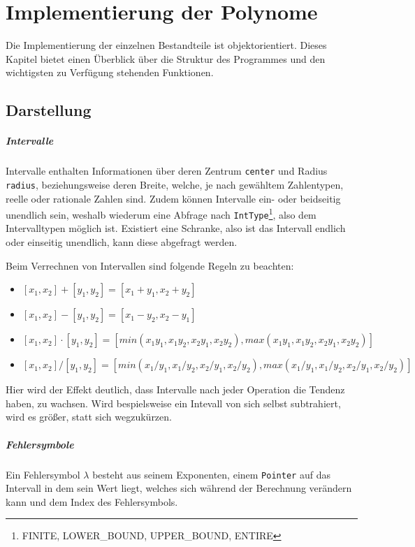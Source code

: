 \chapter{Implementierung der Polynome}

Die Implementierung der einzelnen Bestandteile ist objektorientiert. Dieses Kapitel bietet einen Überblick über die Struktur des Programmes und den wichtigsten zu Verfügung stehenden Funktionen.

\section{Darstellung}

\paragraph{Intervalle}
Intervalle enthalten Informationen über deren Zentrum \verb+center+ und Radius \verb+radius+, beziehungsweise deren Breite, welche, je nach gewähltem Zahlentypen, reelle oder rationale Zahlen sind. Zudem können Intervalle ein- oder beidseitig unendlich sein, weshalb wiederum eine Abfrage nach \verb+IntType+\footnote{ FINITE, LOWER\_BOUND, UPPER\_BOUND, ENTIRE }, also dem Intervalltypen möglich ist. Existiert eine Schranke, also ist das Intervall endlich oder einseitig unendlich, kann diese abgefragt werden. \par
Beim Verrechnen von Intervallen sind folgende Regeln zu beachten:
\begin{itemize}
    \item[] $[x_1, x_2] + [y_1, y_2] = [x_1 + y_1, x_2 + y_2]$
    \item[] $[x_1, x_2] - [y_1, y_2] = [x_1 - y_2, x_2 - y_1]$
    \item[] $[x_1, x_2] \cdot [y_1, y_2] = [min(x_1 y_1, x_1 y_2, x_2 y_1, x_2 y_2), max(x_1 y_1, x_1 y_2, x_2 y_1, x_2 y_2)]$
    \item[] $[x_1, x_2] / [y_1, y_2] = [min(x_1 / y_1, x_1 / y_2, x_2 / y_1, x_2 / y_2), max(x_1 /y_1, x_1 /y_2, x_2 /y_1, x_2 /y_2)]$
\end{itemize}
Hier wird der Effekt deutlich, dass Intervalle nach jeder Operation die Tendenz haben, zu wachsen. Wird  bespielsweise ein Intevall  von sich selbst subtrahiert, wird es größer, statt sich wegzukürzen.



\paragraph{Fehlersymbole} 
Ein Fehlersymbol $\lambda$ besteht aus seinem Exponenten, einem \verb+Pointer+ auf das Intervall in dem sein Wert liegt, welches sich während der Berechnung verändern kann und dem Index des Fehlersymbols.

